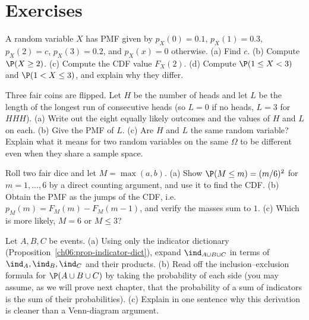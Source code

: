 \section{Exercises}
\label{ch06:exercises}

\begin{exercise}
\label{ch06:ex-read-pmf}
A random variable $X$ has PMF given by $p_X(0) = 0.1$, $p_X(1) = 0.3$,
$p_X(2) = c$, $p_X(3) = 0.2$, and $p_X(x) = 0$ otherwise.
(a) Find $c$. (b) Compute $\P(X \ge 2)$. (c) Compute the CDF value $F_X(2)$.
(d) Compute $\P(1 \le X < 3)$ and $\P(1 < X \le 3)$, and explain why they differ.
\end{exercise}

\begin{exercise}
\label{ch06:ex-build-rv}
Three fair coins are flipped. Let $H$ be the number of heads and let
$L$ be the length of the longest run of consecutive heads (so $L = 0$ if no heads,
$L=3$ for $HHH$). (a) Write out the eight equally likely outcomes and the values of
$H$ and $L$ on each. (b) Give the PMF of $L$. (c) Are $H$ and $L$ the same random
variable? Explain what it means for two random variables on the same $\Omega$ to be
different even when they share a sample space.
\end{exercise}

\begin{exercise}
\label{ch06:ex-max-dice}
Roll two fair dice and let $M = \max(a,b)$. (a) Show $\P(M \le m) = (m/6)^2$ for
$m = 1,\dots,6$ by a direct counting argument, and use it to find the CDF.
(b) Obtain the PMF as the jumps of the CDF, i.e.\ $p_M(m) = F_M(m) - F_M(m-1)$, and
verify the masses sum to $1$. (c) Which is more likely, $M = 6$ or $M \le 3$?
\end{exercise}

\begin{exercise}
\label{ch06:ex-indicator-algebra}
Let $A, B, C$ be events. (a) Using only the indicator dictionary
(Proposition~\ref{ch06:prop-indicator-dict}), expand $\ind_{A \cup B \cup C}$ in terms
of $\ind_A, \ind_B, \ind_C$ and their products. (b) Read off the inclusion--exclusion
formula for $\P(A \cup B \cup C)$ by taking the probability of each side (you may
assume, as we will prove next chapter, that the probability of a sum of indicators is
the sum of their probabilities). (c) Explain in one sentence why this derivation is
cleaner than a Venn-diagram argument.
\end{exercise}

